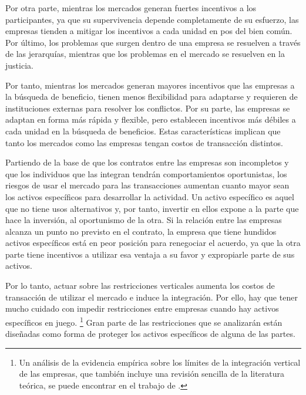 \documentclass[
  12pt,
  spanish,
]{book}
\begin{document}
Por otra parte, mientras los mercados generan fuertes incentivos a los
participantes, ya que su supervivencia depende completamente de su
esfuerzo, las empresas tienden a mitigar los incentivos a cada unidad en
pos del bien común. Por último, los problemas que surgen dentro de una
empresa se resuelven a través de las jerarquías, mientras que los
problemas en el mercado se resuelven en la justicia.

Por tanto, mientras los mercados generan mayores incentivos que las
empresas a la búsqueda de beneficio, tienen menos flexibilidad para
adaptarse y requieren de instituciones externas para resolver los
conflictos. Por su parte, las empresas se adaptan en forma más rápida y
flexible, pero establecen incentivos más débiles a cada unidad en la
búsqueda de beneficios. Estas características implican que tanto los
mercados como las empresas tengan costos de transacción distintos.

Partiendo de la base de que los contratos entre las empresas son
incompletos y que los individuos que las integran tendrán
comportamientos oportunistas, los riesgos de usar el mercado para las
transacciones aumentan cuanto mayor sean los activos específicos para
desarrollar la actividad. Un activo específico es aquel que no tiene
usos alternativos y, por tanto, invertir en ellos expone a la parte que
hace la inversión, al oportunismo de la otra. Si la relación entre las
empresas alcanza un punto no previsto en el contrato, la empresa que
tiene hundidos activos específicos está en peor posición para renegociar
el acuerdo, ya que la otra parte tiene incentivos a utilizar esa ventaja
a su favor y expropiarle parte de sus activos.

Por lo tanto, actuar sobre las restricciones verticales aumenta los
costos de transacción de utilizar el mercado e induce la integración.
Por ello, hay que tener mucho cuidado con impedir restricciones entre
empresas cuando hay activos específicos en juego. \footnote{Un análisis
  de la evidencia empírica sobre los límites de la integración vertical
  de las empresas, que también incluye una revisión sencilla de la
  literatura teórica, se puede encontrar en el trabajo de
  \citet{Lafontaine2007}.} Gran parte de las restricciones que se
analizarán están diseñadas como forma de proteger los activos
específicos de alguna de las partes.
\end{document}
